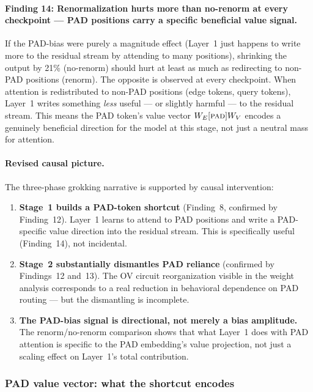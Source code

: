 \documentclass[11pt, a4paper]{article}
\begin{document}
\paragraph{Finding 14: Renormalization hurts more than no-renorm at every checkpoint
--- PAD positions carry a specific beneficial value signal.}
If the PAD-bias were purely a magnitude effect (Layer~1 just happens to write
more to the residual stream by attending to many positions), shrinking the
output by 21\% (no-renorm) should hurt at least as much as redirecting to
non-PAD positions (renorm).  The opposite is observed at every checkpoint.
When attention is redistributed to non-PAD positions (edge tokens, query tokens),
Layer~1 writes something \emph{less} useful --- or slightly harmful --- to the
residual stream.  This means the PAD token's value vector
$W_{E}[\textsc{pad}] W_V$ encodes a genuinely beneficial direction for the model
at this stage, not just a neutral mass for attention.

\paragraph{Revised causal picture.}
The three-phase grokking narrative is supported by causal intervention:

\begin{enumerate}
  \item \textbf{Stage~1 builds a PAD-token shortcut} (Finding~8, confirmed by
    Finding~12). Layer~1 learns to attend to PAD positions and write a
    PAD-specific value direction into the residual stream. This is specifically
    useful (Finding~14), not incidental.
  \item \textbf{Stage~2 substantially dismantles PAD reliance} (confirmed by
    Findings~12 and~13). The OV circuit reorganization visible in the weight
    analysis corresponds to a real reduction in behavioral dependence on PAD
    routing --- but the dismantling is incomplete.
  \item \textbf{The PAD-bias signal is directional, not merely a bias amplitude.}
    The renorm/no-renorm comparison shows that what Layer~1 does with PAD
    attention is specific to the PAD embedding's value projection, not just
    a scaling effect on Layer~1's total contribution.
\end{enumerate}

\subsubsection{PAD value vector: what the shortcut encodes}
\label{sec:pad-value}
\end{document}
